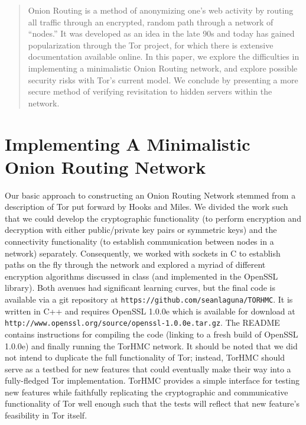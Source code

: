 \documentclass[12pt]{article}
\begin{document}
\maketitle

\begin{abstract}
Onion Routing is a method of anonymizing one's web activity by routing all traffic through an encrypted, random path through a network of ``nodes.'' It was developed as an idea in the late 90s\cite{gold} and today has gained popularization through the Tor project, for which there is extensive documentation available online\cite{tor}. In this paper, we explore the difficulties in implementing a minimalistic Onion Routing network, and explore possible security risks with Tor's current model. We conclude by presenting a more secure method of verifying revisitation to hidden servers within the network.
\end{abstract}

\section{Implementing A Minimalistic Onion Routing Network}
Our basic approach to constructing an Onion Routing Network stemmed from a description of Tor put forward by Hooks and Miles\cite{hook}. We divided the work such that we could develop the cryptographic functionality (to perform encryption and decryption with either public/private key pairs or symmetric keys) and the connectivity functionality (to establish communication between nodes in a network) separately. Consequently, we worked with sockets in C to establish paths on the fly through the network and explored a myriad of different encryption algorithms discussed in class (and implemented in the OpenSSL library). Both avenues had significant learning curves, but the final code is available via a git repository at {\tt https://github.com/seanlaguna/TORHMC}. It is written in C++ and requires OpenSSL 1.0.0e which is available for download at {\tt http://www.openssl.org/source/openssl-1.0.0e.tar.gz}. The README contains instructions for compiling the code (linking to a fresh build of OpenSSL 1.0.0e) and finally running the TorHMC network. It should be noted that we did not intend to duplicate the full functionality of Tor; instead, TorHMC should serve as a testbed for new features that could eventually make their way into a fully-fledged Tor implementation. TorHMC provides a simple interface for testing new features while faithfully replicating the cryptographic and communicative functionality of Tor well enough such that the tests will reflect that new feature's feasibility in Tor itself.
\end{document}
